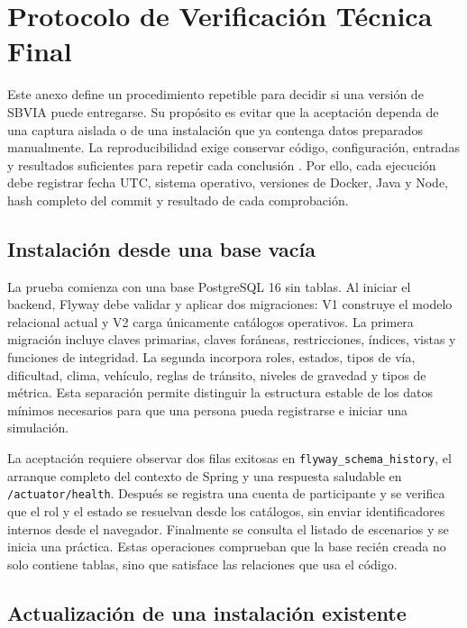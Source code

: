 \documentclass[11pt,a4paper]{report}
\begin{document}
\chapter{Protocolo de Verificación Técnica Final}
\label{anexo:verificacion-final}

Este anexo define un procedimiento repetible para decidir si una versión de SBVIA
puede entregarse. Su propósito es evitar que la aceptación dependa de una captura
aislada o de una instalación que ya contenga datos preparados manualmente. La
reproducibilidad exige conservar código, configuración, entradas y resultados
suficientes para repetir cada conclusión \cite{peng2011reproducible,sandve2013ten}.
Por ello, cada ejecución debe registrar fecha UTC, sistema operativo, versiones de
Docker, Java y Node, hash completo del commit y resultado de cada comprobación.

\section{Instalación desde una base vacía}

La prueba comienza con una base PostgreSQL 16 sin tablas. Al iniciar el backend,
Flyway debe validar y aplicar dos migraciones: V1 construye el modelo relacional
actual y V2 carga únicamente catálogos operativos. La primera migración incluye
claves primarias, claves foráneas, restricciones, índices, vistas y funciones de
integridad. La segunda incorpora roles, estados, tipos de vía, dificultad, clima,
vehículo, reglas de tránsito, niveles de gravedad y tipos de métrica. Esta separación
permite distinguir la estructura estable de los datos mínimos necesarios para que
una persona pueda registrarse e iniciar una simulación.

La aceptación requiere observar dos filas exitosas en
\texttt{flyway\_schema\_history}, el arranque completo del contexto de Spring y una
respuesta saludable en \texttt{/actuator/health}. Después se registra una cuenta de
participante y se verifica que el rol y el estado se resuelvan desde los catálogos,
sin enviar identificadores internos desde el navegador. Finalmente se consulta el
listado de escenarios y se inicia una práctica. Estas operaciones comprueban que la
base recién creada no solo contiene tablas, sino que satisface las relaciones que
usa el código.

\section{Actualización de una instalación existente}
\end{document}
